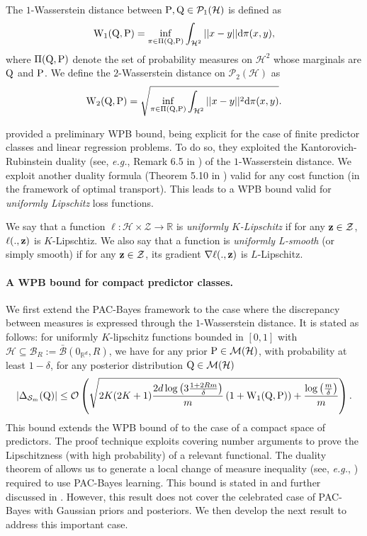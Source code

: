 \begin{definition}
\label{def: wasserstein}
The $1$-Wasserstein distance between $\P,\Q \in \mathcal{P}_1(\mathcal{H})$ is defined as
\[ \W_{1}(\Q,\P) = \inf_{\pi \in \Pi(\Q,\P)} \int_{\mathcal{H}^2} ||x-y||\mathrm{d}\pi(x,y), \]
where $\Pi(\Q,\P)$ denote the set of probability measures on $\mathcal{H}^2$ whose marginals are $\Q$ and $\P$.
We define the $2$-Wasserstein distance on $\mathcal{P}_2(\mathcal{H})$ as
\[ \W_{2}(\Q,\P) = \sqrt{\inf_{\pi \in \Pi(\Q,\P)} \int_{\mathcal{H}^2} ||x-y||^2\mathrm{d}\pi(x,y)}. \]
\end{definition}
\citet{amit2022integral} provided a preliminary WPB bound, being explicit for the case of finite predictor classes and linear regression problems. To do so, they exploited the Kantorovich-Rubinstein duality (see, \emph{e.g.}, Remark 6.5 in \citealp{villani2009optimal}) of the $1$-Wasserstein distance. We exploit another duality formula (Theorem 5.10 in \citealp{villani2009optimal}) valid for any cost function (in the framework of optimal transport). This leads to a WPB bound valid for \emph{uniformly Lipschitz} loss functions.
\begin{definition}
\label{def: unif_lpz}
We say that a function $\ell:\mathcal{H}\times\mathcal{Z}\rightarrow \mathbb{R}$ is \emph{uniformly $K$-Lipschitz} if for any $\z\in\mathcal{Z}$, $\ell(.,\z)$ is $K$-Lipschtiz. We also say that a function is \emph{uniformly L-smooth} (or simply smooth) if for any $\z\in\mathcal{Z}$, its gradient $\nabla \ell(.,\z)$ is $L$-Lipschitz.
\end{definition}

\paragraph{A WPB bound for compact predictor classes.}
We first extend the PAC-Bayes framework to the case where the discrepancy between measures is expressed through the $1$-Wasserstein distance. It is stated as follows: for uniformly $K$-lipschitz functions bounded in $[0,1]$ with  $\mathcal{H}\subseteq \mathcal{B}_R:= \bar{\mathcal{B}}(0_{\mathbb{R}^d},R)$, we have for any prior $\P\in\mathcal{M}(\mathcal{H})$, with probability at least $1-\delta$, for any posterior distribution $\Q\in\mathcal{M}(\mathcal{H})$
\[ |\Delta_{\Sm}(\Q)| \leq \mathcal{O}\left(\sqrt{2K(2K+1)\frac{2d\log\left(3\frac{1 +2Rm }{\delta}\right)}{m} \left(1+\W_{1}(\Q,\P)  \right) +\frac{\log\left( \frac{m}{\delta} \right)}{m} } \right). \]
This bound extends the WPB bound of \citet{amit2022integral} to the case of a compact space of predictors. The proof technique exploits covering number arguments to prove the Lipschitzness (with high probability) of a relevant functional. The duality theorem of \citet[Theorem 5.10]{villani2009optimal} allows us to generate a local change of measure inequality (see, \emph{e.g.}, \citealp{donsker1976asymp}) required to use PAC-Bayes learning.
This bound is stated in  and further discussed in . However, this result does not cover the celebrated case of PAC-Bayes with Gaussian priors and posteriors. We then develop the next result to address this important case.

